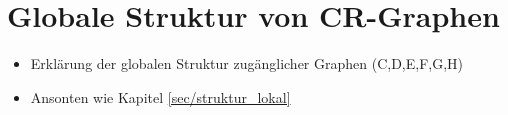 \section{Globale Struktur von CR-Graphen}
\label{sec/struktur_global}

\begin{itemize}
	\item Erklärung der globalen Struktur zugänglicher Graphen (C,D,E,F,G,H)
	\item Ansonten wie Kapitel \ref{sec/struktur_lokal}
\end{itemize}
